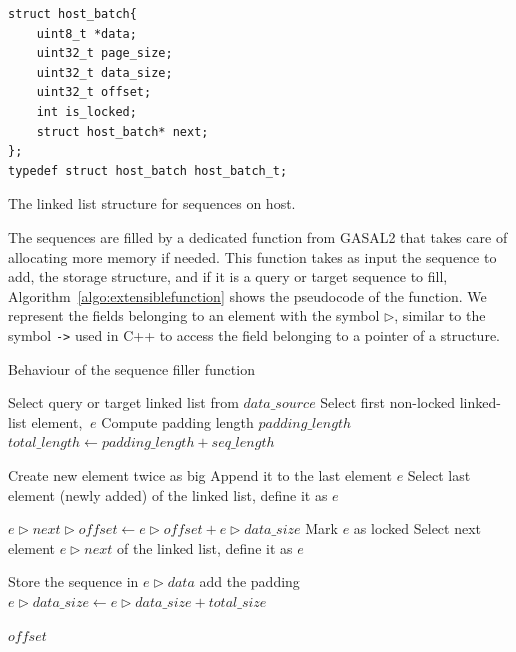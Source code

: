 \begin{listing}[h!]
	\begin{verbatim}
struct host_batch{
	uint8_t *data;
	uint32_t page_size;
	uint32_t data_size;
	uint32_t offset;
	int is_locked;
	struct host_batch* next;
};
typedef struct host_batch host_batch_t;
	\end{verbatim}
\caption{The linked list structure for sequences on host.}
\label{lst:extensiblehostbatch}
\end{listing}

The sequences are filled by a dedicated function from GASAL2 that takes care of allocating more memory if needed. This function takes as input the sequence to add, the storage structure, and if it is a query or target sequence to fill, Algorithm~\ref{algo:extensiblefunction} shows the pseudocode of the function. We represent the fields belonging to an element with the symbol $\rhd$, similar to the symbol \verb|->| used in C++ to access the field belonging to a pointer of a structure.


\begin{algorithm}[h!]
	\caption{Behaviour of the sequence filler function}
	\label{algo:extensiblefunction}
	\begin{algorithmic}[1] %
		
		\State Select query or target linked list from $data\_source$
		\State Select first non-locked linked-list element, $~e$
		\State Compute padding length $padding\_length$
		\State $total\_length \leftarrow padding\_length + seq\_length$
		
			\State Create new element twice as big
			\State Append it to the last element $e$
			\State Select last element (newly added) of the linked list, define it as $e$
		\EndIf
		
			\State $e\rhd next\rhd offset \leftarrow e\rhd offset + e\rhd data\_size $
			\State Mark $e$ as locked
			\State Select next element $e\rhd next$ of the linked list, define it as $e$
		\EndIf
		
			\State Store the sequence in $e\rhd data$ add the padding
			\State $e\rhd data\_size \leftarrow e\rhd data\_size + total\_size$
		
		
		\Return $offset$
		\EndFunction
		
	\end{algorithmic}
\end{algorithm}


